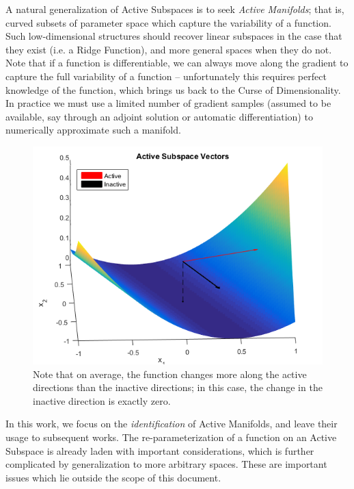 \documentclass[]{aiaa-tc}%
\begin{document}
A natural generalization of Active Subspaces is to seek \emph{Active Manifolds}; that is, curved subsets of parameter space which capture the variability of a function. Such low-dimensional structures should recover linear subspaces in the case that they exist (i.e. a Ridge Function), and more general spaces when they do not. Note that if a function is differentiable, we can always move along the gradient to capture the full variability of a function -- unfortunately this requires perfect knowledge of the function, which brings us back to the Curse of Dimensionality. In practice we must use a limited number of gradient samples (assumed to be available, say through an adjoint solution\cite{Jameson1988} or automatic differentiation\cite{Rall1981}) to numerically approximate such a manifold.

\begin{figure}
 \includegraphics{../images/surface_plot}
 \caption{Note that on average, the function changes more along the active directions than the inactive directions; in this case, the change in the inactive direction is exactly zero.}
 \label{fig:as_example}
\end{figure}

In this work, we focus on the \emph{identification} of Active Manifolds, and leave their usage to subsequent works. The re-parameterization of a function on an Active Subspace is already laden with important considerations, which is further complicated by generalization to more arbitrary spaces. These are important issues which lie outside the scope of this document.
\end{document}
